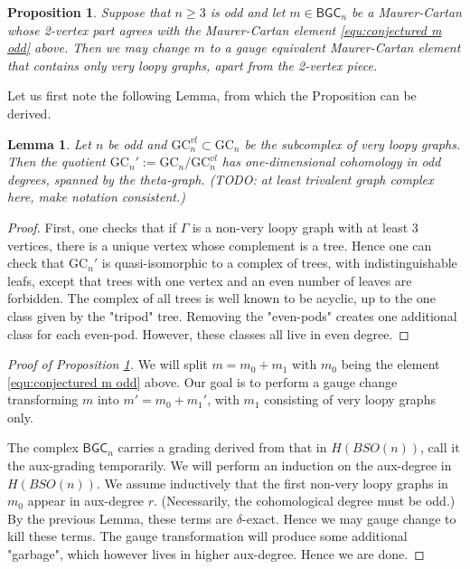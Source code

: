 \documentclass[a4paper]{amsart}
\theoremstyle{plain}
\newtheorem{prop}[thm]{Proposition}
\newtheorem{lemma}[thm]{Lemma}
\theoremstyle{definition}
\newcommand{\GC}{\mathrm{GC}}
\newcommand{\BGC}{\mathsf{BGC}}
\newcommand{\SO}{\mathit{SO}}
\begin{document}
\begin{prop}\label{prop:veryloopy}
Suppose that $n\geq 3$ is odd and let $m\in \BGC_n$ be a Maurer-Cartan whose 2-vertex part agrees with the Maurer-Cartan element \eqref{equ:conjectured m odd} above. Then we may change $m$ to a gauge equivalent Maurer-Cartan element that contains only very loopy graphs, apart from the 2-vertex piece.
\end{prop}

Let us first note the following Lemma, from which the Proposition can be derived.
\begin{lemma}
Let $n$ be odd and $\GC_n^{vl}\subset \GC_n$ be the subcomplex of very loopy graphs. Then the quotient $\GC_n':=\GC_n/\GC_n^{vl}$ has one-dimensional cohomology in odd degrees, spanned by the theta-graph. (TODO: at least trivalent graph complex here, make notation consistent.)
\end{lemma}
\begin{proof}
First, one checks that if $\Gamma$ is a non-very loopy graph with at least 3 vertices, there is a unique vertex whose complement is a tree. Hence one can check that $\GC_n'$ is quasi-isomorphic to a complex of trees, with indistinguishable leafs, except that trees with one vertex and an even number of leaves are forbidden. The complex of all trees is well known to be acyclic, up to the one class given by the "tripod" tree. 
Removing the "even-pods" creates one additional class for each even-pod. However, these classes all live in even degree. 
\end{proof}

\begin{proof}[Proof of Proposition \ref{prop:veryloopy}]
We will split $m=m_0+m_1$ with $m_0$ being the element \eqref{equ:conjectured m odd} above.
Our goal is to perform a gauge change transforming $m$ into $m'=m_0+m_1'$, with $m_1$ consisting of very loopy graphs only.

The complex $\BGC_n$ carries a grading derived from that in $H(B\SO(n))$, call it the aux-grading temporarily.
We will perform an induction on the aux-degree in $H(B\SO(n))$. We assume inductively that the first non-very loopy graphs in $m_0$ appear in aux-degree $r$. (Necessarily, the cohomological degree must be odd.)  
By the previous Lemma, these terms are $\delta$-exact. Hence we may gauge change to kill these terms. The gauge transformation will produce some additional "garbage", which however lives in higher aux-degree. Hence we are done.
\end{proof}
\end{document}
